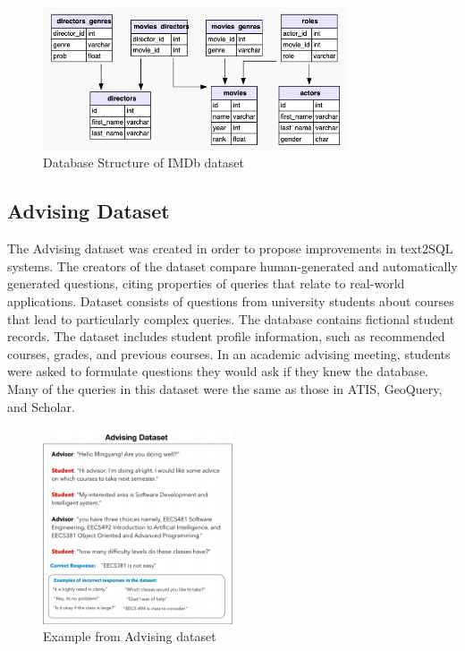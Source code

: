 \begin{figure}[htb]
    \centering
    \includegraphics[width=0.8\textwidth]{pics/db/IMDb.png}
    \caption{Database Structure of IMDb dataset}
    \label{fig:IMDb}
\end{figure}

\newpage %

\subsection{Advising Dataset}

The Advising dataset was created in order to propose improvements in text2SQL systems. The creators of the dataset compare human-generated and automatically generated questions, citing properties of queries that relate to real-world applications. Dataset consists of questions from university students about courses that lead to particularly complex queries. The database contains fictional student records. The dataset includes student profile information, such as recommended courses, grades, and previous courses. In an academic advising meeting, students were asked to formulate questions they would ask if they knew the database. Many of the queries in this dataset were the same as those in ATIS, GeoQuery, and Scholar.

\begin{figure}[htb]
    \centering
    \includegraphics[width=0.5\textwidth]{pics/db/Advising.png}
    \caption{Example from Advising dataset \cite{vig_comparison_2019}}
    \label{fig:Advising}
\end{figure}


